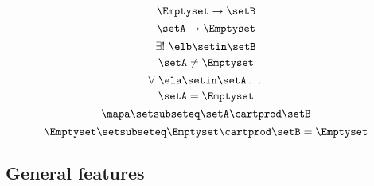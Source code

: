\begin{forslides}
    \begin{equation}
        \label{eq:slides_session2_114}
        \Emptyset \to \setB
    \end{equation}
    \begin{equation}
        \label{eq:slides_session2_115}
        \setA \to \Emptyset
    \end{equation}
    \begin{equation}
        \label{eq:slides_session2_116}
        \exists ! \ \elb \setin\setB
    \end{equation}
    \begin{equation}
        \label{eq:slides_session2_117}
        \setA \neq \Emptyset
    \end{equation}
    \begin{equation}
        \label{eq:slides_session2_118}
        \forall \ \ela \setin\setA \dots
    \end{equation}
    \begin{equation}
        \label{eq:slides_session2_119}
        \setA = \Emptyset
    \end{equation}
    \begin{equation}
        \label{eq:slides_session2_120}
        \mapa \setsubseteq \setA \cartprod \setB
    \end{equation}
    \begin{equation}
        \label{eq:slides_session2_121}
        \Emptyset \setsubseteq \Emptyset \cartprod \setB = \Emptyset
    \end{equation}

    \subsection{General features}


\end{forslides}
